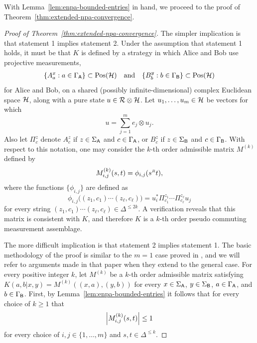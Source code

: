 With Lemma~\ref{lem:enpa-bounded-entries} in hand, we proceed to the proof of Theorem~\ref{thm:extended-npa-convergence}.

\begin{proof}[Proof of Theorem~\ref{thm:extended-npa-convergence}]
  The simpler implication is that statement 1 implies statement 2.
  Under the assumption that statement 1 holds, it must be that $K$ is defined
  by a strategy in which Alice and Bob use projective measurements,
  \begin{align}
  	\{ A_a^x : a \in \Gamma_{\mathsf{A}} \} \subset \mathrm{Pos}(\mathcal{H}) \quad \textnormal{and} \quad \{ B_b^y : b \in \Gamma_{\mathsf{B}} \} \subset \mathrm{Pos}(\mathcal{H})
  \end{align}
  for Alice and Bob, on a shared (possibly infinite-dimensional) complex Euclidean space $\mathcal{H}$, along with a pure state $u\in\mathcal{R}\otimes\mathcal{H}$.
  Let $u_1,\ldots,u_m \in \mathcal{H}$ be vectors for which
  \begin{equation}
    u = \sum_{j = 1}^m e_j \otimes u_j.
  \end{equation}
  Also let $\Pi^z_c$ denote $A^z_c$ if $z\in \Sigma_{\mathsf{A}}$ and $c\in \Gamma_{\mathsf{A}}$, or $B^z_c$ if
  $z\in \Sigma_{\mathsf{B}}$ and $c\in \Gamma_{\mathsf{B}}$.
  With respect to this notation, one may consider the $k$-th order
  admissible matrix $M^{(k)}$ defined by
  \begin{equation}
    M^{(k)}_{i,j}(s,t) = \phi_{i,j}(s^{\mathsmaller{R}}t),
  \end{equation}
  where the functions $\{\phi_{i,j}\}$ are defined as
  \begin{equation}
    \phi_{i,j} \bigl((z_1, c_1) \cdots (z_\ell, c_\ell)\bigr) 
    = u_i^* \Pi_{c_1}^{z_1} \cdots \Pi_{c_\ell}^{z_\ell} u_j
  \end{equation}
  for every string $(z_1, c_1) \cdots (z_\ell, c_\ell)\in\Delta^{\leq 2k}$.
  A verification reveals that this matrix is consistent with $K$, and therefore
  $K$ is a $k$-th order pseudo commuting measurement
    assemblage.

  The more difficult implication is that statement 2 implies statement 1.
  The basic methodology of the proof is similar to the $m=1$ case proved in
  \cite{Navascues2008}, and we will refer to arguments made in that paper
  when they extend to the general case.
  For every positive integer $k$, let $M^{(k)}$ be a $k$-th order admissible
  matrix satisfying $K(a,b|x,y) = M^{(k)}((x,a),(y,b))$ for every $x\in \Sigma_{\mathsf{A}}$,
  $y\in \Sigma_{\mathsf{B}}$, $a\in \Gamma_{\mathsf{A}}$, and $b\in \Gamma_{\mathsf{B}}$.
	First, by Lemma~\ref{lem:enpa-bounded-entries} it follows that for every choice of $k \geq 1$ that 
  \begin{equation}
    \Bigl\lvert M_{i,j}^{(k)}(s,t) \Bigr\rvert \leq 1
  \end{equation}
  for every choice of $i,j\in\{1,\ldots,m\}$ and $s,t\in\Delta^{\leq k}$.


\end{proof}
